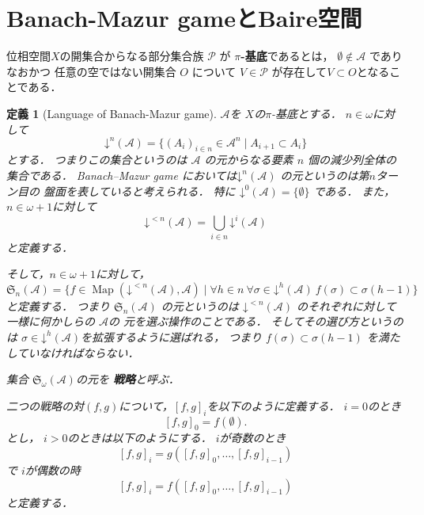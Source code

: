 \documentclass[leqno, 12pt]{jsarticle}
\newtheorem{df}[thm]{定義}
\DeclareMathOperator{\map}{Map}
\newcommand{\mycal}[1]{\mathcal{#1}}
\newcommand{\mydn}[2]{\mathord{\downarrow}^{#1}(#2)}
\newcommand{\mysen}[2]{\mathfrak{S}_{#1}(#2)}
\newcommand{\myka}[3]{[#1, #2]_{#3}}
\begin{document}


\section{Banach-Mazur gameとBaire空間}

位相空間$X$の開集合からなる部分集合族
$\mathcal{P}$
が
\textbf{$\pi$-基底}であるとは，
$\emptyset\not\in \mathcal{A}$
でありなおかつ
任意の空ではない開集合
$O$
について
$V\in \mathcal{P}$
が存在して$V\subset O$となることである．
\begin{df}[Language of Banach-Mazur game]
$\mycal{A}$を $X$の$\pi$-基底とする．
$n\in \omega$に対して
\[
\mydn{n}{\mathcal{A}}
=
\{(A_i)_{i\in n}\in \mathcal{A}^n\mid A_{i+1}\subset A_i\}
\]
とする．
つまりこの集合というのは
$\mycal{A}$
の元からなる要素
$n$
個の減少列全体の集合である．
Banach--Mazur game
においては$\mydn{n}{\mathcal{A}}$
の元というのは第$n$ターン目の
盤面を表していると考えられる．
特に
$\mydn{0}{\mycal{A}}=\{\emptyset\}$
である．
また，$n\in \omega+1$に対して
\[
\mydn{<n}{\mathcal{A}}=
\bigcup_{i\in n}
\mydn{i}{\mycal{A}}
\]
と定義する．

そして，$n\in \omega+1$に対して，
\[
\mysen{n}{\mycal{A}}
=
\{f\in
 \map(\mydn{<n}{\mathcal{A}}, \mathcal{A})\mid
 \forall h\in n\  \forall \sigma\in 
 \mydn{h}{\mathcal{A}}\ 
 f(\sigma)\subset \sigma(h-1)
 \}
\]
と定義する．
つまり
$\mysen{n}{\mycal{A}}$
の元というのは
$\mydn{<n}{\mathcal{A}}$
のそれぞれに対して一様に何かしらの
$\mycal{A}$の
元を選ぶ操作のことである．
そしてその選び方というのは
$\sigma\in 
\mydn{h}{\mathcal{A}}$を拡張するように選ばれる，
つまり
$ f(\sigma)\subset \sigma(h-1)$
を満たしていなければならない．

集合
$\mysen{\omega}{\mycal{A}}$の元を
\textbf{戦略}と呼ぶ．

二つの戦略の対$(f, g)$について，$[f, g]_i$を以下のように定義する．
$i=0$のとき
\[
\myka{f}{g}{0}=f(\emptyset). 
\]
とし，
$i>0$のときは以下のようにする．
$i$が奇数のとき
\[
\myka{f}{g}{i}
=
g(\myka{f}{g}{0}, \dots, 
\myka{f}{g}{i-1})
\]
で
$i$が偶数の時
\[
\myka{f}{g}{i}
=f(\myka{f}{g}{0}, \dots, \myka{f}{g}{i-1})
\]
と定義する．
\end{df}
\end{document}
